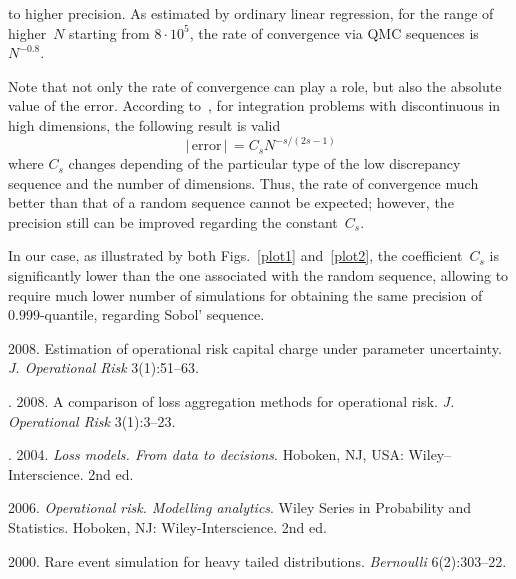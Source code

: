 \begin{multicols}{2}

\noindent
 to higher precision. As estimated by ordinary linear
regression,
 for the range of higher~$N$ starting from
$8\cdot10^5$, the rate of convergence via QMC sequences is~$N^{-0.8}$.

Note that not only the rate of convergence can play a role, but also
the absolute value of the error. According to~\cite{Morok}, for
integration problems with discontinuous in high dimensions, the
following result is valid
\begin{equation}
\label{rate}
\,|\,\mbox{error}\,|\, = C_sN^{-s/(2s-1)}
\end{equation}
where $C_s$ changes depending of the particular type of the low
discrepancy sequence and the number of dimensions. Thus, the rate
of convergence much better than that of a random sequence cannot
be expected; however, the precision still can be improved regarding
the constant~$C_s$.

In our case, as illustrated by both Figs.~\ref{plot1} and~\ref{plot2},
the coefficient~$C_s$ is significantly lower than the
one associated with the random sequence, allowing to require much
lower number of simulations for obtaining the same precision of
0.999-quantile, regarding Sobol' sequence.

\renewcommand{\bibname}{\protect\rmfamily References}
{\small\frenchspacing
{%
\begin{thebibliography}{99}

2008. Estimation of operational risk capital charge
under parameter uncertainty. \textit{J. Operational Risk} 3(1):51--63.

.
2008. A comparison of loss aggregation
methods for operational risk. \textit{J. Operational Risk} 3(1):3--23.

.
2004. \textit{Loss models.
From data to  decisions}. Hoboken, NJ, USA: Wiley--Interscience. 2nd ed.

2006. \textit{Operational risk. Modelling analytics}.
Wiley Series in Probability and Statistics. Hoboken, NJ: Wiley-Interscience. 2nd ed.

2000. Rare event
simulation for heavy tailed distributions. \textit{Bernoulli}
6(2):303--22.




\end{thebibliography}}}
\end{multicols}
